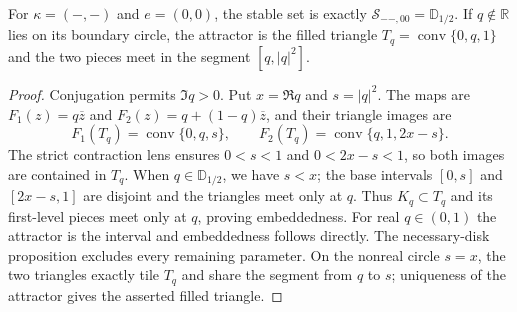 \begin{proposition}
\label{prop:oo00-stable-disk}
For $\kappa=(-,-)$ and $e=(0,0)$, the stable set is exactly
$\mathcal S_{--,00}=\mathbb D_{1/2}$. If $q\notin\mathbb R$ lies on its
boundary circle, the attractor is the filled triangle
$T_q=\operatorname{conv}\{0,q,1\}$ and the two pieces meet in the segment
$[q,|q|^2]$.
\end{proposition}
\begin{proof}
Conjugation permits $\Im q>0$. Put $x=\Re q$ and $s=|q|^2$. The maps are
$F_1(z)=q\overline z$ and $F_2(z)=q+(1-q)\overline z$, and their triangle
images are
\[
 F_1(T_q)=\operatorname{conv}\{0,q,s\},\qquad
 F_2(T_q)=\operatorname{conv}\{q,1,2x-s\}.
\]
The strict contraction lens ensures $0<s<1$ and $0<2x-s<1$, so both images
are contained in $T_q$. When $q\in\mathbb D_{1/2}$, we have $s<x$;
the base intervals $[0,s]$ and $[2x-s,1]$ are disjoint and the triangles
meet only at $q$. Thus $K_q\subset T_q$ and its first-level pieces meet
only at $q$, proving embeddedness. For real $q\in(0,1)$ the attractor is
the interval and embeddedness follows directly. The necessary-disk
proposition excludes every remaining parameter. On the nonreal circle
$s=x$, the two triangles exactly tile $T_q$ and share the segment from
$q$ to $s$; uniqueness of the attractor gives the asserted filled triangle.
\end{proof}



